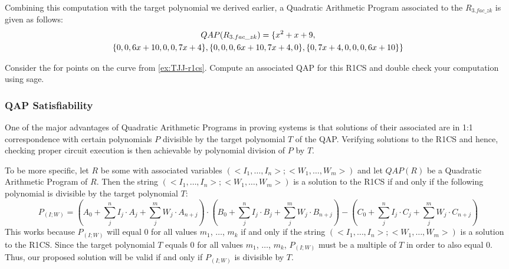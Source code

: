 \begin{example}[3-factorization]
Combining this computation with the target polynomial we derived earlier, a Quadratic Arithmetic Program associated to the  $R_{3.fac\_zk}$ is given as follows:
\begin{multline}
\label{QAP-R3-fac-zk}
QAP(R_{3.fac\_zk}) =\{x^{2}+x+9,\notag\\
 \{0,0,6x+10,0,0,7x+4\},\{0,0,0,6x+10,7x+4,0\},\{0,7x+4,0,0,0,6x+10\}\}
\end{multline}
\end{example}
\begin{exercise}
Consider the  for points on the  curve from \examplename{} \ref{ex:TJJ-r1cs}. Compute an associated QAP for this R1CS and double check your computation using sage.
\end{exercise}
\subsubsection{QAP Satisfiability} One of the major advantages of Quadratic Arithmetic Programs in proving systems is that solutions of their associated  are in 1:1 correspondence with certain polynomials $P$ divisible by the target polynomial $T$ of the QAP. Verifying solutions to the R1CS and hence, checking proper circuit execution is then achievable by polynomial division of $P$ by $T$.

To be more specific, let $R$ be some  with associated variables $(<I_1,\ldots,I_n>; <W_1,\ldots, W_m>)$ and let $QAP(R)$ be a Quadratic Arithmetic Program of $R$. Then the string $(<I_1,\ldots,I_n>; <W_1,\ldots, W_m>)$ is a solution to the R1CS if and only if the following polynomial is divisible by the target polynomial $T$:
\begin{equation}\label{polynomial-P-IW}
P_{(I;W)} = \scriptstyle \left(A_0 + \sum_{j}^n I_j\cdot A_j + \sum_{j}^m W_j\cdot A_{n+j} \right) \cdot \left(B_0 + \sum_{j}^n I_j\cdot B_j + \sum_{j}^m W_j\cdot B_{n+j} \right) 
-\left(C_0 + \sum_{j}^n I_j\cdot C_j + \sum_{j}^m W_j\cdot C_{n+j} \right)
\end{equation}
This works because $P_{(I;W)}$ will equal $0$ for all values $m_1$, $\ldots$, $m_k$ if and only if the string $(<I_1,\ldots,I_n>; <W_1,\ldots, W_m>)$ is a solution to the R1CS. Since the target polynomial $T$ equals $0$ for all values $m_1$, $\ldots$, $m_k$, $P_{(I;W)}$ must be a multiple of $T$ in order to also equal $0$. Thus, our proposed solution will be valid if and only if $P_{(I;W)}$ is divisible by $T$.

